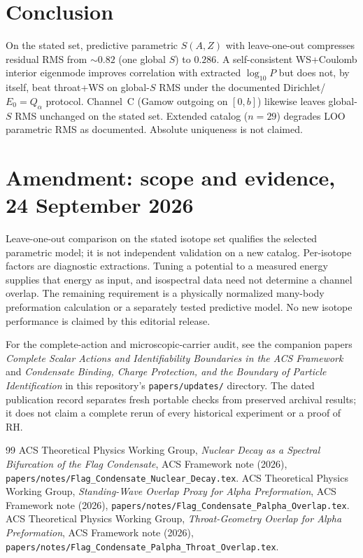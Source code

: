 \documentclass[11pt,a4paper]{article}
\theoremstyle{remark}
\begin{document}
\section{Conclusion}

On the stated set, predictive parametric $S(A,Z)$ with leave-one-out
compresses residual RMS from $\sim 0.82$ (one global $S$) to $0.286$.
A self-consistent WS+Coulomb interior eigenmode improves correlation with
extracted $\log_{10}P$ but does not, by itself, beat throat+WS on
global-$S$ RMS under the documented Dirichlet/$E_0=Q_\alpha$ protocol.
Channel~C (Gamow outgoing on $[0,b]$) likewise leaves global-$S$ RMS
unchanged on the stated set.  Extended catalog ($n=29$) degrades LOO
parametric RMS as documented.  Absolute uniqueness is not claimed.


\section*{Amendment: scope and evidence, 24 September 2026}
Leave-one-out comparison on the stated isotope set qualifies the selected parametric model; it is not independent validation on a new catalog. Per-isotope factors are diagnostic extractions. Tuning a potential to a measured energy supplies that energy as input, and isospectral data need not determine a channel overlap. The remaining requirement is a physically normalized many-body preformation calculation or a separately tested predictive model. No new isotope performance is claimed by this editorial release.

For the complete-action and microscopic-carrier audit, see the companion
papers \emph{Complete Scalar Actions and Identifiability Boundaries in the ACS
Framework} and \emph{Condensate Binding, Charge Protection, and the Boundary
of Particle Identification} in this repository's \texttt{papers/updates/}
directory. The dated publication record separates fresh portable checks
from preserved archival results; it does not claim a complete rerun of every
historical experiment or a proof of RH.

\begin{thebibliography}{99}
  ACS Theoretical Physics Working Group,
  \emph{Nuclear Decay as a Spectral Bifurcation of the Flag Condensate},
  ACS Framework note (2026),
  \nolinkurl{papers/notes/Flag_Condensate_Nuclear_Decay.tex}.
  ACS Theoretical Physics Working Group,
  \emph{Standing-Wave Overlap Proxy for Alpha Preformation},
  ACS Framework note (2026),
  \nolinkurl{papers/notes/Flag_Condensate_Palpha_Overlap.tex}.
  ACS Theoretical Physics Working Group,
  \emph{Throat-Geometry Overlap for Alpha Preformation},
  ACS Framework note (2026),
  \nolinkurl{papers/notes/Flag_Condensate_Palpha_Throat_Overlap.tex}.
\end{thebibliography}
\end{document}
